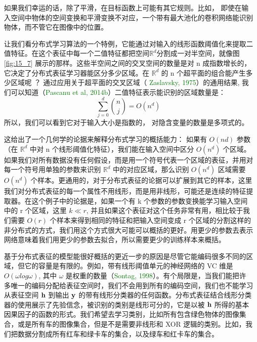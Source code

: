 如果我们幸运的话，除了平滑，在目标函数上可能有其它规则。比如， 即使在输入空间中物体的空间变换和平滑变换不对应，一个带有最大池化的卷积网络能识别物体，而不管它在图像中的位置。

让我们看分布式学习算法的一个特例，它能通过对输入的线形函数阈值化来提取二值特征。在这个表征中每一个二值特征都把空间$\mathbb{R}^d$分割成一对半空间，就像图 \ref{fig:15_7} 展示的那样。这些半空间之间的交叉空间的数量是对 n 成指数增长的，它决定了分布式表征学习器能区分多少区域。在 $\mathbb{R}^d$ 的 n 个超平面的组合能产生多少区域呢 ？ 通过应用关于超平面的交叉区域（ \textcolor{green}{Zaslavsky, 1975}）的通用结果,  我们可以知道（\textcolor{green}{Pascanu et al, 2014b}）二值特征表示能识别的区域数量是：
\begin{equation}
	\sum_{j=0}^d \binom{n}{j}= O(n^d)	
\label{equ:15.4}
\end{equation}
所以，我们可以看到它对于输入大小是指数的， 对隐含变量的数量是多项式的。


这给出了一个几何学的论据来解释分布式学习的概括能力： 如果有 $O(nd)$ 参数（在 $\mathbb{R}^d$ 中对 n 个线形阈值化特征），我们能在输入空间中区分 $O(n^d)$ 个区域。如果我们对所有数据没有任何假设，而是用一个符号代表一个区域的表征，并用对每一个符号用单独的参数来识别 $\mathbb{R}^d$ 中的对应区域，那么识别 $O(n^d)$ 区域需要 $O(n^d)$ 个样本。更通用的，对于分布式表征的论据可以扩展到其它的样本，这里我们对分布式表征的每一个属性不用线形，而是用非线形，可能还是连续的特征提取器。在这个例子中的论据是，如果一个有 k 个参数的参数变换能学习输入空间中的 r 个区域，这里 $k \ll r$,  并且如果这个表征对这个任务非常有用，相比较于我们需要 $O(r)$ 个样本来得到相同的特征和把输入空间变成 r 个区域的分割这样的非分布式的方式，我们用这个方式很大可能可以概括的更好。用更少的参数去表示网络意味着我们用更少的参数去拟合，所以需要更少的训练样本来概括。

基于分布式表征的模型能很好概括的更近一步的原因是尽管它能编码很多不同的区域，但它的容量是有限的。例如，带有线形阈值单元的神经网络的 VC 维是 $O(\omega log \omega)$, 其中 $\omega$ 是权重的数量（\textcolor{green}{Sontag, 1998}）。有个局限是，当我们能把许多唯一的编码分配给表征空间时，我们不会用到所有的编码空间，我们也不能学习从表征空间 $\bf h$ 到输出 $\bf y$ 的带有线形分类器的任何函数。分布式表征结合线形分类器的使用展示了先验信念，被识别的类别是线形可分的，它是以被 $\bf h$ 所得的基本因果因子的函数的形式。我们希望去学习类别，比如所有包含绿色物体的图像集合，或是所有车的图像集合，但是不是需要非线形和 XOR 逻辑的类别。比如，我们把数据分割成所有红车和绿卡车的集合，以及绿车和红卡车的集合。



